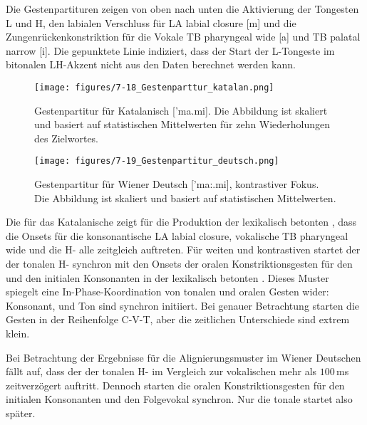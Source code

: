 Die Gestenpartituren zeigen von oben nach unten die Aktivierung der Tongesten L und H, den labialen Verschluss für {LA labial closure} [m] und die Zungenrückenkonstriktion für die Vokale {TB pharyngeal wide} [a] und {TB palatal narrow} [i]. Die gepunktete Linie indiziert, dass der Start der L-Tongeste im bitonalen LH-Akzent nicht aus den Daten berechnet werden kann.

 

\begin{figure}[t]
	\texttt{[image: figures/7-18\_Gestenparttur\_katalan.png]}
	\caption{Gestenpartitur für Katalanisch ['ma.mi]. Die Abbildung ist skaliert und basiert auf statistischen Mittelwerten für zehn Wiederholungen des Zielwortes.}
	\label{figure:0718}
\end{figure}

\begin{figure}[t]
	\texttt{[image: figures/7-19\_Gestenpartitur\_deutsch.png]}
	\caption{Gestenpartitur für Wiener Deutsch ['ma:.mi], kontrastiver Fokus. Die Abbildung ist skaliert und basiert auf statistischen Mittelwerten.}
	\label{figure:0719}
\end{figure}

\newpage   
Die  für das Katalanische zeigt für die Produktion der lexikalisch betonten , dass die Onsets für die konsonantische {LA labial closure}, vokalische {TB pharyngeal wide} und die H- alle zeitgleich auftreten. Für weiten und kontrastiven  startet der  der tonalen H- synchron mit den Onsets der oralen Konstriktionsgesten für den  und den initialen Konsonanten in der lexikalisch betonten . Dieses Muster spiegelt eine In-Phase-Koordination von tonalen und oralen Gesten wider: Konsonant,  und Ton sind synchron initiiert. Bei genauer Betrachtung starten die Gesten in der Reihenfolge C-V-T, aber die zeitlichen Unterschiede sind extrem klein.


  
Bei Betrachtung der Ergebnisse für die Alignierungsmuster im Wiener Deutschen fällt auf, dass der  der tonalen H- im Vergleich zur vokalischen  mehr als $100$\,ms zeitverzögert auftritt. Dennoch starten die oralen Konstriktionsgesten für den initialen Konsonanten und den Folgevokal synchron. Nur die tonale  startet also später.

